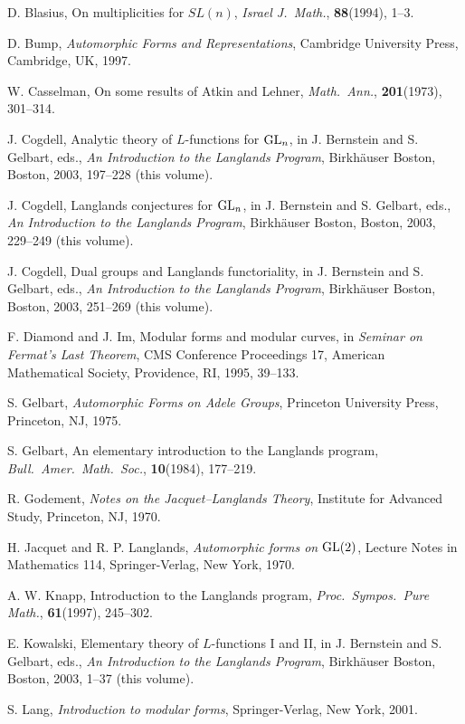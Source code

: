 \begin{enumerate}[label={[\arabic*]},leftmargin=2.8em,itemsep=0.35em,topsep=0.4em]
\item D. Blasius, On multiplicities for $SL(n)$, \emph{Israel J.\ Math.}, \textbf{88}(1994), 1--3.
\item D. Bump, \emph{Automorphic Forms and Representations}, Cambridge University Press, Cambridge, UK, 1997.
\item W. Casselman, On some results of Atkin and Lehner, \emph{Math.\ Ann.}, \textbf{201}(1973), 301--314.
\item J. Cogdell, Analytic theory of $L$-functions for $\mathrm{GL}_n$, in J. Bernstein and S. Gelbart, eds., \emph{An Introduction to the Langlands Program}, Birkhäuser Boston, Boston, 2003, 197--228 (this volume).
\item J. Cogdell, Langlands conjectures for $\mathrm{GL}_n$, in J. Bernstein and S. Gelbart, eds., \emph{An Introduction to the Langlands Program}, Birkhäuser Boston, Boston, 2003, 229--249 (this volume).
\item J. Cogdell, Dual groups and Langlands functoriality, in J. Bernstein and S. Gelbart, eds., \emph{An Introduction to the Langlands Program}, Birkhäuser Boston, Boston, 2003, 251--269 (this volume).
\item F. Diamond and J. Im, Modular forms and modular curves, in \emph{Seminar on Fermat's Last Theorem}, CMS Conference Proceedings 17, American Mathematical Society, Providence, RI, 1995, 39--133.
\item S. Gelbart, \emph{Automorphic Forms on Adele Groups}, Princeton University Press, Princeton, NJ, 1975.
\item S. Gelbart, An elementary introduction to the Langlands program, \emph{Bull.\ Amer.\ Math.\ Soc.}, \textbf{10}(1984), 177--219.
\item R. Godement, \emph{Notes on the Jacquet--Langlands Theory}, Institute for Advanced Study, Princeton, NJ, 1970.
\item H. Jacquet and R. P. Langlands, \emph{Automorphic forms on $\mathrm{GL}(2)$}, Lecture Notes in Mathematics 114, Springer-Verlag, New York, 1970.
\item A. W. Knapp, Introduction to the Langlands program, \emph{Proc.\ Sympos.\ Pure Math.}, \textbf{61}(1997), 245--302.
\item E. Kowalski, Elementary theory of $L$-functions I and II, in J. Bernstein and S. Gelbart, eds., \emph{An Introduction to the Langlands Program}, Birkhäuser Boston, Boston, 2003, 1--37 (this volume).
\item S. Lang, \emph{Introduction to modular forms}, Springer-Verlag, New York, 2001.

\end{enumerate}
